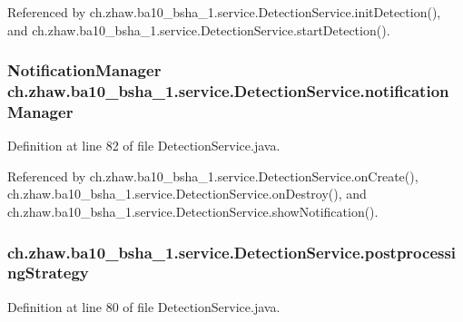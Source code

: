Referenced by ch.zhaw.ba10\_\-bsha\_\-1.service.DetectionService.initDetection(), and ch.zhaw.ba10\_\-bsha\_\-1.service.DetectionService.startDetection().\hypertarget{classch_1_1zhaw_1_1ba10__bsha__1_1_1service_1_1DetectionService_a805b20b9685b173065d4bbceeb3a73d3}{
\subsubsection[{notificationManager}]{\setlength{\rightskip}{0pt plus 5cm}NotificationManager {\bf ch.zhaw.ba10\_\-bsha\_\-1.service.DetectionService.notificationManager}}}
\label{classch_1_1zhaw_1_1ba10__bsha__1_1_1service_1_1DetectionService_a805b20b9685b173065d4bbceeb3a73d3}


Definition at line 82 of file DetectionService.java.

Referenced by ch.zhaw.ba10\_\-bsha\_\-1.service.DetectionService.onCreate(), ch.zhaw.ba10\_\-bsha\_\-1.service.DetectionService.onDestroy(), and ch.zhaw.ba10\_\-bsha\_\-1.service.DetectionService.showNotification().\hypertarget{classch_1_1zhaw_1_1ba10__bsha__1_1_1service_1_1DetectionService_addd3104ced0625818552e1c6459269ec}{
\subsubsection[{postprocessingStrategy}]{ {\bf ch.zhaw.ba10\_\-bsha\_\-1.service.DetectionService.postprocessingStrategy}}}
\label{classch_1_1zhaw_1_1ba10__bsha__1_1_1service_1_1DetectionService_addd3104ced0625818552e1c6459269ec}


Definition at line 80 of file DetectionService.java.

